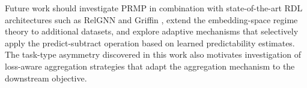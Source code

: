 \documentclass[11pt,letterpaper]{article}
\begin{document}
Future work should investigate PRMP in combination with state-of-the-art RDL architectures such as RelGNN \citep{Chen2025} and Griffin \citep{Wang2025}, extend the embedding-space regime theory to additional datasets, and explore adaptive mechanisms that selectively apply the predict-subtract operation based on learned predictability estimates. The task-type asymmetry discovered in this work also motivates investigation of loss-aware aggregation strategies that adapt the aggregation mechanism to the downstream objective.



\end{document}

